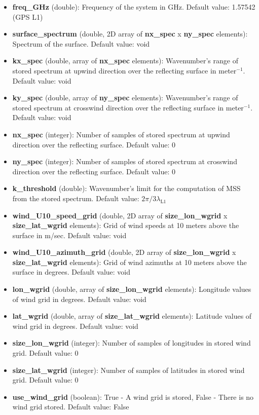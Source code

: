 \begin{itemize}
\item {\bf freq\_GHz} (double): Frequency of the system in GHz. Default value: 1.57542 (GPS L1)

\item {\bf surface\_spectrum} (double, 2D array of {\bf nx\_spec} x {\bf ny\_spec} elements): Spectrum of the surface. Default value: void

\item {\bf kx\_spec} (double, array of {\bf nx\_spec} elements): Wavenumber's range of stored spectrum at upwind direction over the reflecting surface in meter$^{-1}$. Default value: void

\item {\bf ky\_spec} (double, array of {\bf ny\_spec} elements): Wavenumber's range of stored spectrum at crosswind direction over the reflecting surface in meter$^{-1}$. Default value: void

\item {\bf nx\_spec} (integer): Number of samples of stored spectrum at upwind direction over the reflecting surface. Default value: 0

\item {\bf ny\_spec} (integer): Number of samples of stored spectrum at crosswind direction over the reflecting surface. Default value: 0

\item {\bf k\_threshold} (double): Wavenumber's limit for the computation of MSS from the stored spectrum. Default value: $2\pi/3\lambda_\mathrm{L1}$

\item {\bf wind\_U10\_speed\_grid} (double, 2D array of {\bf size\_lon\_wgrid} x {\bf size\_lat\_wgrid} elements): Grid of wind speeds at 10 meters above the surface in m/sec. Default value: void

\item {\bf wind\_U10\_azimuth\_grid} (double, 2D array of {\bf size\_lon\_wgrid} x {\bf size\_lat\_wgrid} elements): Grid of wind azimuths at 10 meters above the surface in degrees. Default value: void

\item {\bf lon\_wgrid} (double, array of {\bf size\_lon\_wgrid} elements): Longitude values of wind grid in degrees. Default value: void

\item {\bf lat\_wgrid} (double, array of {\bf size\_lat\_wgrid} elements): Latitude values of wind grid in degrees. Default value: void

\item {\bf size\_lon\_wgrid} (integer): Number of samples of longitudes in stored wind grid. Default value: 0

\item {\bf size\_lat\_wgrid} (integer): Number of samples of latitudes in stored wind grid. Default value: 0

\item {\bf use\_wind\_grid} (boolean): True - A wind grid is stored, False - There is no wind grid stored. Default value: False
\end{itemize}


